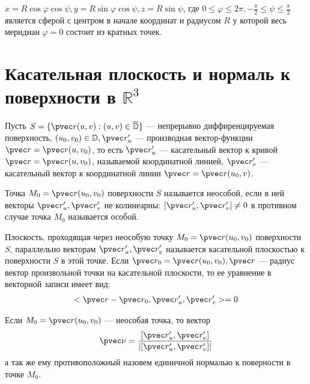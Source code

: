\begin{example}
  $x = R \cos \varphi \cos \psi, y = R \sin \varphi \cos \psi, z = R \sin
  \psi$, где $0 \leq \varphi \leq 2\pi, -\frac{\pi}{2} \leq \psi \leq
  \frac{\pi}{2}$ является сферой с центром в начале координат и радиусом $R$ у
  которой весь меридиан $\varphi = 0$ состоит из кратных точек.
\end{example}

\section{Касательная плоскость и нормаль к поверхности в $\mathbb{R}^3$}

Пусть $S = \{\pvec r(u, v) : (u, v) \in \overline{\mathbb{D}}\}$ --- непрерывно
диффиренцируемая поверхность, $(u_0, v_0) \in \mathbb{D}, \pvec r_u'$ ---
производная вектор-функции $\pvec r = \pvec r(u, v_0)$, то есть $\pvec r_u'$ ---
касательный вектор к кривой $\pvec r = \pvec r(u, v_0)$, называемой координатной
линией, $\pvec r_v'$ --- касательный вектор к координатной линии $\pvec r = \pvec
r(u_0, v)$.

\begin{definition}
  Точка $M_0 = \pvec r(u_0, v_0)$ поверхности $S$ называется неособой, если в
  ней векторы $\pvec r_u', \pvec r_v'$ не колинеарны: $[\pvec r_u', \pvec r_v']
  \not = 0$ в противном случае точка $M_0$ называется особой.
\end{definition}

\begin{definition}
  Плоскость, проходящая через неособую точку $M_0 = \pvec r(u_0, v_0)$
  поверхности $S$, параллельно векторам $\pvec r_u', \pvec r_v'$ называется
  касательной плоскостью к поверхности $S$ в этой точке. Если $\pvec r_0 = \pvec
  r(u_0, v_0), \pvec r$ --- радиус вектор произвольной точки на касательной
  плоскости, то ее уравнение в векторной записи имеет вид:
  \begin{gather}
    < \pvec r - \pvec r_0, \pvec r_u', \pvec r_v' > = 0
  \end{gather}
\end{definition}

\begin{definition}
  Если $M_0 = \pvec r(u_0, v_0)$ --- неособая точка, то вектор
  \begin{gather}
    \pvec\nu = \frac{[\pvec r_u', \pvec r_v']}{\left|[\pvec r_u', \pvec
    r_v']\right|}
    \label{def723:eq1}
  \end{gather}
  а так же ему противоположный назовем единичной нормалью к поверности в точке
  $M_0$.
\end{definition}

